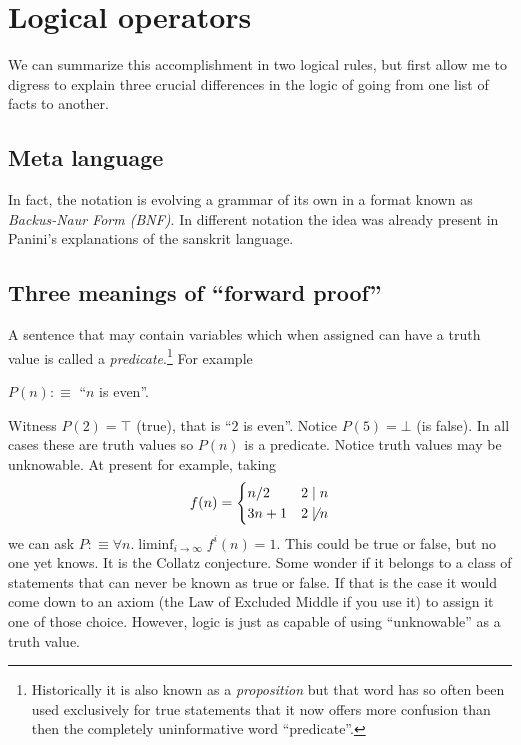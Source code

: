 \section{Logical operators}

We can summarize this accomplishment in two logical rules, but first allow 
me to digress to explain three crucial differences in the logic of going from 
one list of facts to another.

\subsection{Meta language}

In fact, the notation  is evolving a grammar of its own
in a format known as \emph{Backus-Naur Form (BNF)}.  In different notation the 
idea was already present in Panini's explanations of the sanskrit language.


\subsection{Three meanings of ``forward proof''}
 A sentence that may contain variables which when 
assigned can have a truth value is called a \emph{predicate}.\footnote{Historically it 
is also known as a \emph{proposition} but that word has so often been used exclusively 
for true statements that it now offers more confusion than then the completely uninformative word ``predicate''.}  
For example 
\begin{center}
    $P(n):\equiv$ ``$n$ is even''.
\end{center}
Witness $P(2)=\top$ (true), that is ``$2$ is even''.  
Notice $P(5)=\bot$ (is false).  In all cases these are truth values
so $P(n)$ is a predicate.  Notice truth values may be unknowable.
At present for example, taking 
\[ 
    f(n) =\begin{cases} n/2 & 2\mid n\\ 3n+1 & 2\not\mid n \end{cases}
\]
we can ask $P:\equiv \forall n.\liminf_{i\to \infty}f^i(n)=1$.
This could be true or false, but no one yet knows.  It is the Collatz conjecture.
Some wonder if it belongs to a class of statements that can never be known
as true or false.  If that is the case it would come down to an axiom 
(the Law of Excluded Middle if you use it) to assign it one of those choice.
However, logic is just as capable of using ``unknowable'' as a truth value.

